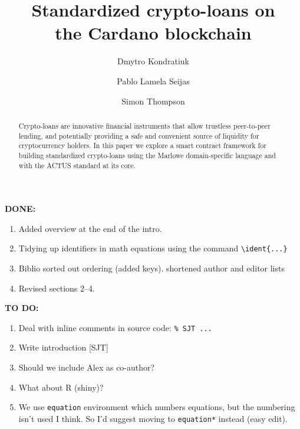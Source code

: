 \documentclass[runningheads]{llncs}
\newcommand{\ident}[1]{\mbox{\emph{#1}}}
\begin{document}
\title{Standardized crypto-loans on\\ the Cardano blockchain}%


\author{Dmytro Kondratiuk \and
				Pablo {Lamela Seijas} \and
                Simon Thompson}





%
\maketitle              %
%
\begin{abstract}
Crypto-loans are %
innovative financial instruments that
allow trustless peer-to-peer %
lending, and potentially providing a safe and convenient
source of liquidity for cryptocurrency holders. In this paper we
explore a smart contract framework for building standardized crypto-loans
using the Marlowe domain-specific language and with the ACTUS standard at its core.

\end{abstract}


\textbf{DONE:}
\begin{enumerate}
\item
Added overview at the end of the intro.
\item
Tidying up identifiers in math equations using the command \verb+\ident{...}+
\item
Biblio sorted out ordering (added keys). shortened author and editor lists
\item
Revised sections 2--4.
\end{enumerate}

\textbf{TO DO:}
\begin{enumerate}
\item
Deal with inline comments in source code: \verb+% SJT ...+
\item
Write introduction [SJT]
\item
Should we include Alex as co-author?
\item
What about R (shiny)?
\item
We use \verb+equation+ environment which numbers equations, but the numbering isn't used I think.
So I'd suggest moving to \verb+equation*+ instead (easy edit).
\end{enumerate}
\end{document}
